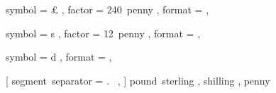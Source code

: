 

 {
	symbol = { £ } ,
	factor = { 240~penny } ,
	format = { \SYMBOL\VALUE } ,
}

 {
	symbol = { s } ,
	factor = { 12~penny } ,
	format = { \VALUE\SYMBOL } ,
}

 {
	symbol = { d } ,
	format = { \VALUE\SYMBOL } ,
}

 [
	segment~separator = {.~} ,
] {
	pound~sterling ,
	shilling ,
	penny
}
